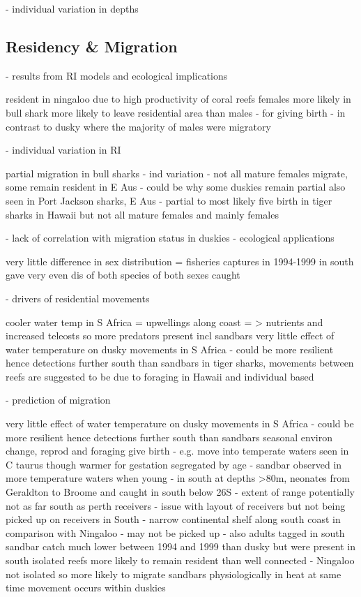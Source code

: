 \documentclass[11pt,a4paper]{article}
\begin{document}
	
	- individual variation in depths

	

	\subsection{Residency \& Migration}
	
	- results from RI models and ecological implications
	
	resident in ningaloo due to high productivity of coral reefs \citep{Espinoza2016}
	females more likely in bull shark more likely to leave residential area than males - for giving birth \citep{Espinoza2016} - in contrast to dusky where the majority of males were migratory
	
	- individual variation in RI
	
	partial migration in bull sharks - ind variation - not all mature females migrate, some remain resident in E Aus \citep{Espinoza2016} - could be why some duskies remain
	partial also seen in Port Jackson sharks, E Aus - \citep{Bass2017}
	partial to most likely five birth in tiger sharks in Hawaii but not all mature females and mainly females \citep{Papastamatiou2013}
	
	- lack of correlation with migration status in duskies - ecological applications
	
	very little difference in sex distribution = fisheries captures in 1994-1999 in south gave very even dis of both species of both sexes caught \citep{McAuley2003}
	
	- drivers of residential movements
	
	cooler water temp in S Africa = upwellings along coast = > nutrients and increased teleosts so more predators present incl sandbars \citep{Wintner2018}
	very little effect of water temperature on dusky movements in S Africa - could be more resilient hence detections further south than sandbars
	in tiger sharks, movements between reefs are suggested to be due to foraging in Hawaii and individual based \citep{Papastamatiou2013}
	
	- prediction of migration
	
	very little effect of water temperature on dusky movements in S Africa - could be more resilient hence detections further south than sandbars \citep{Wintner2018}
	seasonal environ change, reprod and foraging \citep{Espinoza2015}
	give birth - e.g. move into temperate waters seen in C taurus though warmer for gestation \citep{Dicken2007}
	segregated by age - sandbar observed in more temperature waters when young - in south at depths \textgreater 80m, neonates from Geraldton to Broome and caught in south below 26S \citep{McAuley2005} - extent of range potentially not as far south as perth receivers - issue with layout of receivers
	but not being picked up on receivers in South - narrow continental shelf along south coast in comparison with Ningaloo - may not be picked up - also adults tagged in south
	sandbar catch much lower between 1994 and 1999 than dusky but were present in south \citep{McAuley2003}
	isolated reefs more likely to remain resident than well connected \citep{Espinoza2015} - Ningaloo not isolated so more likely to migrate
	sandbars physiologically in heat at same time movement occurs within duskies \citep{McAuley2005}
	
\end{document}
